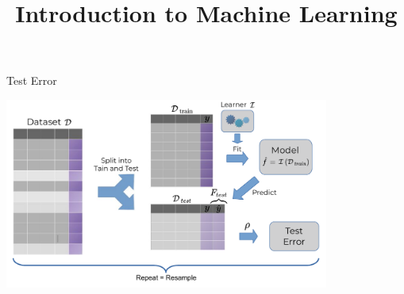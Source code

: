 \documentclass[11pt,compress,t,notes=noshow, xcolor=table]{beamer}
\title{Introduction to Machine Learning}
\institute{\href{https://compstat-lmu.github.io/lecture_i2ml/}{compstat-lmu.github.io/lecture\_i2ml}}
\date{}
\begin{document}















\begin{vbframe}{Test Error}

\includegraphics[width=0.8\textwidth, trim=270 0 0 0, clip]{figure_man/test_error.pdf}

\end{vbframe}
\end{document}
